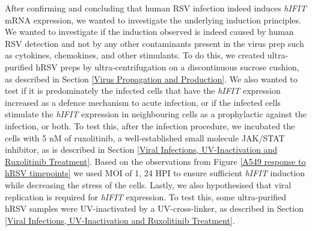 After confirming and concluding that human RSV infection indeed induces \textit{hIFIT} mRNA expression, we wanted to investigate the underlying induction principles. We wanted to investigate if the induction observed is indeed caused by human RSV detection and not by any other contaminants present in the virus prep such as cytokines, chemokines, and other stimulants. To do this, we created ultra-purified hRSV preps by ultra-centrifugation on a discontinuous sucrose cushion, as described in Section \ref{Virus Propagation and Production}. We also wanted to test if it is predominately the infected cells that have the \textit{hIFIT} expression increased as a defence mechanism to acute infection, or if the infected cells stimulate the \textit{hIFIT} expression in neighbouring cells as a prophylactic against the infection, or both. To test this, after the infection procedure, we incubated the cells with 5 nM of ruxolitinib, a well-established small molecule JAK/STAT inhibitor, as is described in Section \ref{Viral Infections, UV-Inactivation and Ruxolitinib Treatment}. Based on the observations from Figure \ref{A549 response to hRSV timepoints} we used MOI of 1, 24 HPI to ensure sufficient \textit{hIFIT} induction while decreasing the stress of the cells.  Lastly, we also hypothesised that viral replication is required for \textit{hIFIT} expression. To test this, some ultra-purified hRSV samples were UV-inactivated by a UV-cross-linker, as described in Section \ref{Viral Infections, UV-Inactivation and Ruxolitinib Treatment}.


